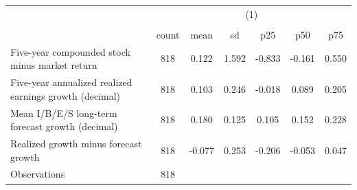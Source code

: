 {
\def\sym#1{\ifmmode^{#1}\else\(^{#1}\)\fi}
\begin{tabular}{l*{1}{cccccc}}
\hline\hline
                    &\multicolumn{6}{c}{(1)}                                                      \\
                    &\multicolumn{6}{c}{}                                                         \\
                    &       count&        mean&          sd&         p25&         p50&         p75\\
\hline
Five-year compounded stock minus market return&         818&       0.122&       1.592&      -0.833&      -0.161&       0.550\\
Five-year annualized realized earnings growth (decimal)&         818&       0.103&       0.246&      -0.018&       0.089&       0.205\\
Mean I/B/E/S long-term forecast growth (decimal)&         818&       0.180&       0.125&       0.105&       0.152&       0.228\\
Realized growth minus forecast growth&         818&      -0.077&       0.253&      -0.206&      -0.053&       0.047\\
\hline
Observations        &         818&            &            &            &            &            \\
\hline\hline
\end{tabular}
}
